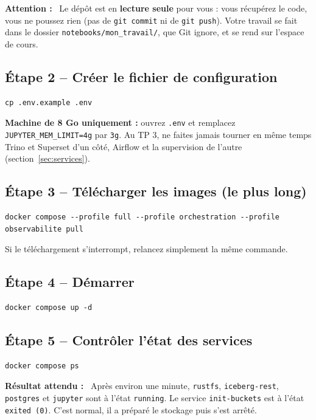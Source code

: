 \documentclass[11pt,a4paper]{article}
\newenvironment{resultat}{\par\medskip\noindent\textbf{Résultat attendu :}\ }{\par\medskip}
\newenvironment{attention}{\par\medskip\noindent\textbf{\textcolor{lhred}{Attention :}}\ }{\par\medskip}
\newcommand{\cmd}[1]{\texttt{#1}}
\begin{document}
\begin{attention}
Le dépôt est en \textbf{lecture seule} pour vous : vous récupérez le code, vous ne poussez rien
(pas de \cmd{git commit} ni de \cmd{git push}). Votre travail se fait dans le dossier
\cmd{notebooks/mon\_travail/}, que Git ignore, et se rend sur l'espace de cours.
\end{attention}

\subsection*{Étape 2 -- Créer le fichier de configuration}
\begin{lstlisting}[style=shell]
cp .env.example .env
\end{lstlisting}
\textbf{Machine de 8 Go uniquement :} ouvrez \cmd{.env} et remplacez \cmd{JUPYTER\_MEM\_LIMIT=4g} par \cmd{3g}.
Au TP 3, ne faites jamais tourner en même temps Trino et Superset d'un côté, Airflow et la
supervision de l'autre (section~\ref{sec:services}).

\subsection*{Étape 3 -- Télécharger les images (le plus long)}
\begin{lstlisting}[style=shell]
docker compose --profile full --profile orchestration --profile observabilite pull
\end{lstlisting}
Si le téléchargement s'interrompt, relancez simplement la même commande.

\subsection*{Étape 4 -- Démarrer}
\begin{lstlisting}[style=shell]
docker compose up -d
\end{lstlisting}

\subsection*{Étape 5 -- Contrôler l'état des services}
\begin{lstlisting}[style=shell]
docker compose ps
\end{lstlisting}

\begin{resultat}
Après environ une minute, \texttt{rustfs}, \texttt{iceberg-rest}, \texttt{postgres} et \texttt{jupyter}
sont à l'état \texttt{running}. Le service \texttt{init-buckets} est à l'état \texttt{exited (0)}.
C'est normal, il a préparé le stockage puis s'est arrêté.
\end{resultat}
\end{document}
